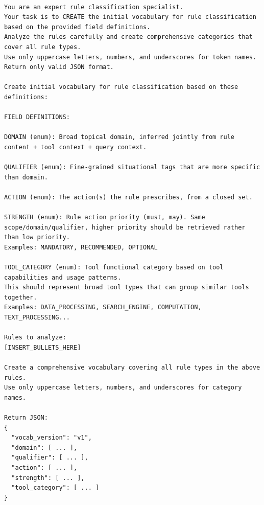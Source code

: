 \begin{lstlisting}[style=promptstyle, caption={Prompt used to induce the rule classification vocabulary from a batch of rules. Placeholders are filled dynamically.}]

You are an expert rule classification specialist.
Your task is to CREATE the initial vocabulary for rule classification based on the provided field definitions.
Analyze the rules carefully and create comprehensive categories that cover all rule types.
Use only uppercase letters, numbers, and underscores for token names.
Return only valid JSON format.

Create initial vocabulary for rule classification based on these definitions:

FIELD DEFINITIONS:

DOMAIN (enum): Broad topical domain, inferred jointly from rule content + tool context + query context.

QUALIFIER (enum): Fine-grained situational tags that are more specific than domain.

ACTION (enum): The action(s) the rule prescribes, from a closed set.

STRENGTH (enum): Rule action priority (must, may). Same scope/domain/qualifier, higher priority should be retrieved rather than low priority.
Examples: MANDATORY, RECOMMENDED, OPTIONAL

TOOL_CATEGORY (enum): Tool functional category based on tool capabilities and usage patterns.
This should represent broad tool types that can group similar tools together.
Examples: DATA_PROCESSING, SEARCH_ENGINE, COMPUTATION, TEXT_PROCESSING...

Rules to analyze:
[INSERT_BULLETS_HERE]

Create a comprehensive vocabulary covering all rule types in the above rules.
Use only uppercase letters, numbers, and underscores for category names.

Return JSON:
{
  "vocab_version": "v1",
  "domain": [ ... ],
  "qualifier": [ ... ],
  "action": [ ... ],
  "strength": [ ... ],
  "tool_category": [ ... ]
}
\end{lstlisting}




